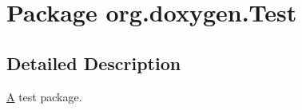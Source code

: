 \hypertarget{namespaceorg_1_1doxygen_1_1_test}{}\section{Package org.\+doxygen.\+Test}
\label{namespaceorg_1_1doxygen_1_1_test}


\subsection{Detailed Description}
\mbox{\hyperlink{class_a}{A}} test package. 